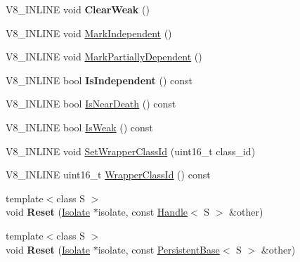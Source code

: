 \begin{DoxyCompactItemize}
\item 
\hypertarget{classv8_1_1PersistentBase_afe515daead108cceb1699b54051df13b}{}V8\+\_\+\+I\+N\+L\+I\+N\+E void {\bfseries Clear\+Weak} ()\label{classv8_1_1PersistentBase_afe515daead108cceb1699b54051df13b}

\item 
V8\+\_\+\+I\+N\+L\+I\+N\+E void \hyperlink{classv8_1_1PersistentBase_aed12b0a54bc5ade1fb44e3bdb3a1fe74}{Mark\+Independent} ()
\item 
V8\+\_\+\+I\+N\+L\+I\+N\+E void \hyperlink{classv8_1_1PersistentBase_a4a876d30dda0dfb812e82bb240e4686e}{Mark\+Partially\+Dependent} ()
\item 
\hypertarget{classv8_1_1PersistentBase_a2ed93b6be1b27c299906935ef35d2114}{}V8\+\_\+\+I\+N\+L\+I\+N\+E bool {\bfseries Is\+Independent} () const \label{classv8_1_1PersistentBase_a2ed93b6be1b27c299906935ef35d2114}

\item 
V8\+\_\+\+I\+N\+L\+I\+N\+E bool \hyperlink{classv8_1_1PersistentBase_a4a64c26d91ed6a276aa8a7ca4bb7683a}{Is\+Near\+Death} () const 
\item 
V8\+\_\+\+I\+N\+L\+I\+N\+E bool \hyperlink{classv8_1_1PersistentBase_a714b7794149df483837a2c6b09d52396}{Is\+Weak} () const 
\item 
V8\+\_\+\+I\+N\+L\+I\+N\+E void \hyperlink{classv8_1_1PersistentBase_ac4c979164b3ed4dc92319e6f5a108d3d}{Set\+Wrapper\+Class\+Id} (uint16\+\_\+t class\+\_\+id)
\item 
V8\+\_\+\+I\+N\+L\+I\+N\+E uint16\+\_\+t \hyperlink{classv8_1_1PersistentBase_a01a46bf4e69ed9a837639702ee234643}{Wrapper\+Class\+Id} () const 
\item 
\hypertarget{classv8_1_1PersistentBase_a1d3ad48623c429889afb03b557c926e0}{}{\footnotesize template$<$class S $>$ }\\void {\bfseries Reset} (\hyperlink{classv8_1_1Isolate}{Isolate} $\ast$isolate, const \hyperlink{classv8_1_1Handle}{Handle}$<$ S $>$ \&other)\label{classv8_1_1PersistentBase_a1d3ad48623c429889afb03b557c926e0}

\item 
\hypertarget{classv8_1_1PersistentBase_a67cbcedf77d176d3870fa4993e300b61}{}{\footnotesize template$<$class S $>$ }\\void {\bfseries Reset} (\hyperlink{classv8_1_1Isolate}{Isolate} $\ast$isolate, const \hyperlink{classv8_1_1PersistentBase}{Persistent\+Base}$<$ S $>$ \&other)\label{classv8_1_1PersistentBase_a67cbcedf77d176d3870fa4993e300b61}


\end{DoxyCompactItemize}
